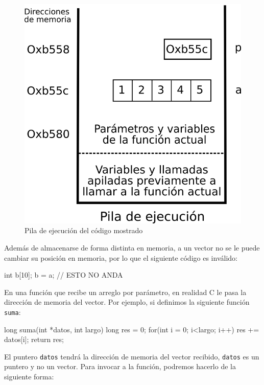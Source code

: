 \begin{figure}[htb] 
\centering
\includegraphics{imagenes/vectores-pila}
\caption{Pila de ejecución del código mostrado}
\end{figure}

Además de almacenarse de forma distinta en memoria, a un vector no se le puede
cambiar su posición en memoria, por lo que el siguiente código es inválido:

\begin{codigo-c-plano}
  int b[10];
  b = a; // ESTO NO ANDA
\end{codigo-c-plano}

En una función que recibe un arreglo por parámetro, en realidad C le pasa la
dirección de memoria del vector. Por ejemplo, si definimos la siguiente
función \lstinline!suma!:

\begin{codigo-c-plano}
  long suma(int *datos, int largo) 
  {
    long res = 0;
    for(int i = 0; i<largo; i++) {
        res += datos[i];
    }
    return res;
  }
\end{codigo-c-plano}

El puntero \lstinline!datos! tendrá la dirección de memoria del vector recibido, 
\lstinline!datos! es un puntero y no un vector.  Para invocar a la función,
podremos hacerlo de la siguiente forma:


